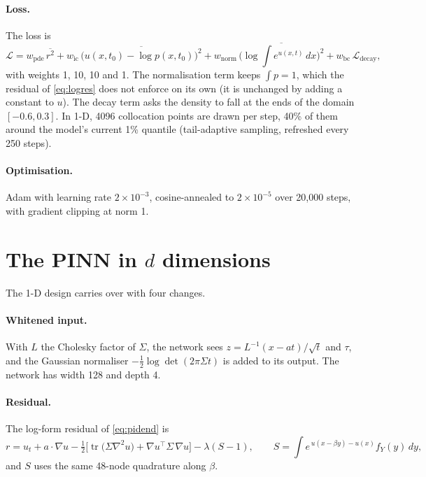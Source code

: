 \paragraph{Loss.} The loss is
\begin{equation}
  \mathcal{L} = w_{\mathrm{pde}}\,\overline{r^2}
              + w_{\mathrm{ic}}\,\overline{\big(u(x, t_0) - \log p(x, t_0)\big)^2}
              + w_{\mathrm{norm}}\,\overline{\Big(\log \textstyle\int e^{u(x,t)}\,dx\Big)^2}
              + w_{\mathrm{bc}}\,\mathcal{L}_{\mathrm{decay}},
  \label{eq:loss1d}
\end{equation}
with weights 1, 10, 10 and 1. The normalisation term keeps $\int p = 1$, which the residual of
\cref{eq:logres} does not enforce on its own (it is unchanged by adding a constant to $u$). The decay term
asks the density to fall at the ends of the domain $[-0.6, 0.3]$. In 1-D, 4096 collocation points are drawn
per step, 40\% of them around the model's current 1\% quantile (tail-adaptive sampling, refreshed every 250
steps).

\paragraph{Optimisation.} Adam with learning rate $2\times10^{-3}$, cosine-annealed to $2\times10^{-5}$ over
20{,}000 steps, with gradient clipping at norm 1.

\section{The PINN in $d$ dimensions}
\label{sec:met-pinnnd}

The 1-D design carries over with four changes.

\paragraph{Whitened input.} With $L$ the Cholesky factor of $\Sigma$, the network sees
$z = L^{-1}(x - a t)/\sqrt{t}$ and $\tau$, and the Gaussian normaliser
$-\tfrac12\log\det(2\pi\Sigma t)$ is added to its output. The network has width 128 and depth 4.

\paragraph{Residual.} The log-form residual of \cref{eq:pidend} is
\begin{equation}
  r = u_t + a\cdot\nabla u - \tfrac12\Big[\operatorname{tr}\!\big(\Sigma\nabla^2 u\big)
      + \nabla u^\top \Sigma\, \nabla u\Big] - \lambda (S - 1), \qquad
  S = \int e^{\,u(x - \beta y) - u(x)} f_Y(y)\,dy,
\end{equation}
and $S$ uses the same 48-node quadrature along $\beta$.

